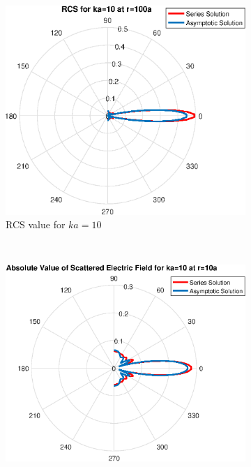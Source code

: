 \documentclass[11pt]{amsart}
\begin{document}
\begin{figure}[!h]
    \centering
    \begin{subfigure}[b]{0.5\textwidth}
        \includegraphics[width=\textwidth]{AsymRCSka10}
        \caption{RCS value for $ka=10$}
        \label{fig:gull}
    \end{subfigure}
    ~ %
    \begin{subfigure}[b]{0.5\textwidth}
        \includegraphics[width=\textwidth]{AsymEka10}

\end{subfigure}
\end{figure}
\end{document}
